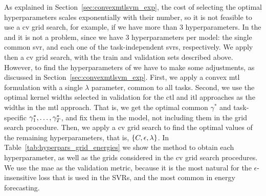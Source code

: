 %
As explained in Section~\ref{sec:convexmtlsvm_exp}, the cost of selecting the optimal hyperparameters scales exponentially with their number, so it is not feasible to use a \acrshort{cv} grid search, for example, if we have more than $3$ hyperparameters.
%
In the  and  it is not a problem, since we have $3$ hyperparameters per model: the single common \acrshort{svr}, and each one of the task-independent \acrshort{svr}s, respectively. We apply then a \acrshort{cv} grid search, with the train and validation sets described above.
However, to find the hyperparameters of  we have to make some adjustments, as discussed in Section~\ref{sec:convexmtlsvm_exp}. 
%
First, we apply a convex \acrshort{mtl} formulation with a single $\lambda$ parameter, common to all tasks.
%
Second, we use the optimal kernel widths selected in validation for the \acrshort{ctl} and \acrshort{itl} approaches as the widths in the \acrshort{mtl} approach. That is, we get the optimal common $\gamma^*$ and task-specific $\gamma^*_1, \ldots, \gamma^*_T$, and fix them in the  model, not including them in the grid search procedure.
Then, we apply a \acrshort{cv} grid search to find the optimal values of the remaining hyperparameters, that is, $\left\{C, \epsilon, \lambda\right\}$.
%
In Table~\ref{tab:hyperpars_grid_energies} we show the method to obtain each hyperparameter, as well as the grids considered in the \acrshort{cv} grid search procedures.
We use the \acrshort{mae} as the validation metric, because it is the most natural for the $\epsilon$-insensitive loss that is used in the SVRs, and the most common in energy forecasting.

